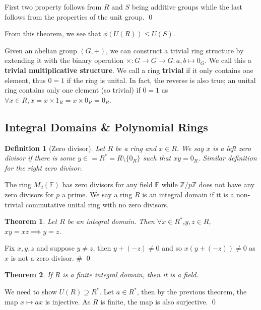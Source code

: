 \documentclass[
]{article}
\newtheorem{theorem}{Theorem}
\newtheorem{definition}{Definition}[theorem]
\begin{document}
First two property follows from \(R\) and \(S\) being additive groups
while the last follows from the properties of the unit group. \qed

From this theorem, we see that \(\phi(U(R)) \le U(S)\).

Given an abelian group \((G, +)\), we can construct a trivial ring
structure by extending it with the binary operation
\(\times : G \to G \to G : a, b \mapsto 0_G\). We call this a
\textbf{trivial multiplicative structure}. We call a ring
\textbf{trivial} if it only contains one element, thus \(0 = 1\) if the
ring is unital. In fact, the reverse is also true; an unital ring
contains only one element (so trivial) if \(0 = 1\) as
\(\forall x \in R, x = x \times 1_R = x \times 0_R = 0_R\).

\hypertarget{integral-domains-polynomial-rings}{%
\subsection{Integral Domains \& Polynomial
Rings}\label{integral-domains-polynomial-rings}}

\begin{definition} [Zero divisor]
  Let \(R\) be a ring and \(x \in R\). We say \(x\) is a left zero divisor if 
  there is some \(y \in = R^* = R \setminus\{0_R\}\) such that \(xy = 0_R\). 
  Similar definition for the right zero divisor.
\end{definition}

The ring \(M_2(\mathbb{F})\) has zero divisors for any field
\(\mathbb{F}\) while \(\mathbb{Z} / p\mathbb{Z}\) does not have any zero
divisors for \(p\) a prime. We say a ring \(R\) is an integral domain if
it is a non-trivial commutative unital ring with no zero divisors.

\begin{theorem}
  Let \(R\) be an integral domain. Then \(\forall x \in R^*\),\(y, z \in R\),
  \(xy = xz \implies y = z\).
\end{theorem}
\proof

Fix \(x, y, z\) and suppose \(y \neq z\), then \(y + (-z) \neq 0\) and
so \(x (y + (-z)) \neq 0\) as \(x\) is not a zero divisor. \# \qed

\begin{theorem}
  If \(R\) is a finite integral domain, then it is a field.
\end{theorem}
\proof

We need to show \(U(R) \supseteq R^*\). Let \(a \in R^*\), then by the
previous theorem, the map \(x \mapsto ax\) is injective. As \(R\) is
finite, the map is also surjective. \qed
\end{document}

